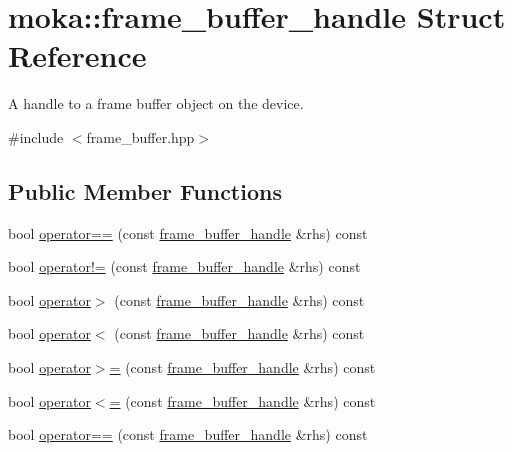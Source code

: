\hypertarget{structmoka_1_1frame__buffer__handle}{}\section{moka\+::frame\+\_\+buffer\+\_\+handle Struct Reference}
\label{structmoka_1_1frame__buffer__handle}


A handle to a frame buffer object on the device.  




{\ttfamily \#include $<$frame\+\_\+buffer.\+hpp$>$}

\subsection*{Public Member Functions}
\begin{DoxyCompactItemize}
\item 
bool \mbox{\hyperlink{structmoka_1_1frame__buffer__handle_ad1e8780bd34cd59aadd2c922f4fabe54}{operator==}} (const \mbox{\hyperlink{structmoka_1_1frame__buffer__handle}{frame\+\_\+buffer\+\_\+handle}} \&rhs) const
\item 
bool \mbox{\hyperlink{structmoka_1_1frame__buffer__handle_a98984b93552728bed0e67073c3412c3c}{operator!=}} (const \mbox{\hyperlink{structmoka_1_1frame__buffer__handle}{frame\+\_\+buffer\+\_\+handle}} \&rhs) const
\item 
bool \mbox{\hyperlink{structmoka_1_1frame__buffer__handle_a8d3069ff959b4df8113a6047de9a587f}{operator$>$}} (const \mbox{\hyperlink{structmoka_1_1frame__buffer__handle}{frame\+\_\+buffer\+\_\+handle}} \&rhs) const
\item 
bool \mbox{\hyperlink{structmoka_1_1frame__buffer__handle_a6647204ed60a12d61789981e99fa6c4f}{operator$<$}} (const \mbox{\hyperlink{structmoka_1_1frame__buffer__handle}{frame\+\_\+buffer\+\_\+handle}} \&rhs) const
\item 
bool \mbox{\hyperlink{structmoka_1_1frame__buffer__handle_a534fb2973b16baa39aa8961f9f9656cb}{operator$>$=}} (const \mbox{\hyperlink{structmoka_1_1frame__buffer__handle}{frame\+\_\+buffer\+\_\+handle}} \&rhs) const
\item 
bool \mbox{\hyperlink{structmoka_1_1frame__buffer__handle_aa624933fa41eacbe6900d7d79580629e}{operator$<$=}} (const \mbox{\hyperlink{structmoka_1_1frame__buffer__handle}{frame\+\_\+buffer\+\_\+handle}} \&rhs) const
\item 
bool \mbox{\hyperlink{structmoka_1_1frame__buffer__handle_ad1e8780bd34cd59aadd2c922f4fabe54}{operator==}} (const \mbox{\hyperlink{structmoka_1_1frame__buffer__handle}{frame\+\_\+buffer\+\_\+handle}} \&rhs) const

\end{DoxyCompactItemize}
